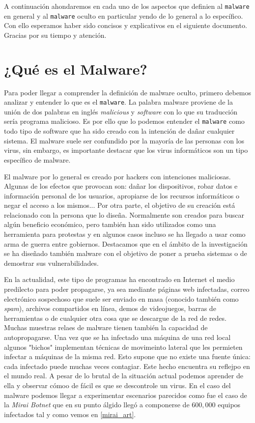\documentclass[12pt]{article}
\newcommand{\newpar} {
    \vskip 1cm
}
\begin{document}
        \newpar

        A continuación ahondaremos en cada uno de los aspectos que definien al \texttt{malware} en general y al \texttt{malware} oculto en particular yendo de lo general a lo específico. Con ello esperamos haber sido concisos y explicativos en el siguiente documento. Gracias por su tiempo y atención.

    \section{¿Qué es el Malware?}
        Para poder llegar a comprender la definición de malware oculto, primero debemos analizar y entender lo que es el \texttt{malware}. La palabra malware proviene de la unión de dos palabras en inglés \textit{malicious} y \textit{software} con lo que su traducción sería programa malicioso. Es por ello que lo podemos entender el \texttt{malware} como todo tipo de software que ha sido creado con la intención de dañar cualquier sistema. El malware suele ser confundido por la mayoría de las personas con los virus, sin embargo, es importante destacar que los virus informáticos son un tipo específico de malware.

        \newpar

        El malware por lo general es creado por hackers con intenciones maliciosas. Algunas de los efectos que provocan son: dañar los dispositivos, robar datos e información personal de los usuarios, apropiarse de los recursos informáticos o negar el acceso a los mismos... Por otra parte, el objetivo de su creación está relacionado con la persona que lo diseña. Normalmente son creados para buscar algún beneficio económico, pero también han sido utilizados como una herramienta para protestas y en algunos casos incluso se ha llegado a usar como arma de guerra entre gobiernos. Destacamos que en el ámbito de la investigación se ha diseñado también malware con el objetivo de poner a prueba sistemas o de demostrar sus vulnerabilidades.

        \newpar

        En la actualidad, este tipo de programas ha encontrado en Internet el medio predilecto para poder propagarse, ya sea mediante páginas web infectadas, correo electrónico sospechoso que suele ser enviado en masa (conocido también como \textit{spam}), archivos compartidos en línea, demos de videojuegos, barras de herramientas o de cualquier otra cosa que se descargue de la red de redes. Muchas muestras relaes de malware tienen también la capacidad de autopropagarse. Una vez que se ha infectado una máquina de una red local algunos "bichos" implementan técnicas de movimeinto lateral que les permieten infectar a máquinas de la misma red. Esto supone que no existe una fuente única: cada infectado puede muchas veces contagiar. Este hecho encuentra su reflejpo en el mundo real. A pesar de lo brutal de la situación actual podemos aprender de ella y observar cómoo de fácil es que se descontrole un virus. En el caso del malware podemos llegar a experimentar escenarios parecidos como fue el caso de la \textit{Mirai Botnet} que en su punto álgido llegó a componerse de $600,000$ equipos infectados tal y como vemos en \ref{mirai_art}.
\end{document}
